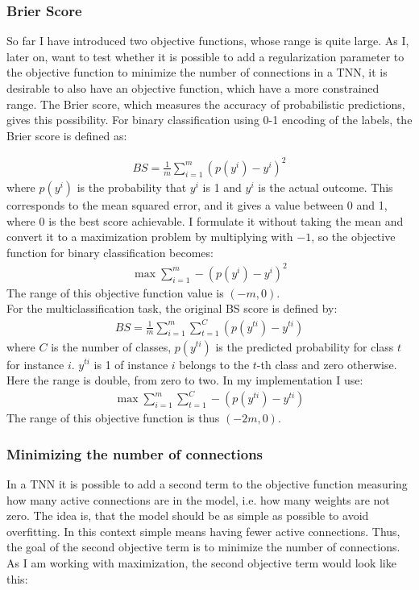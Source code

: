 \subsubsection{Brier Score}
So far I have introduced two objective functions, whose range is quite large. As I, later on, want to test whether it is possible to add a regularization parameter to the objective function to minimize the number of connections in a TNN, it is desirable to also have an objective function, which have a more constrained range. The Brier score, which measures the accuracy of probabilistic predictions, gives this possibility. For binary classification using 0-1 encoding of the labels, the Brier score is defined as: 

\begin{align}
    BS = \frac{1}{m} \sum_{i = 1} ^m (p(y^i) - y^i) ^2 
\end{align}
where $p(y^i)$ is the probability that $y^i$ is 1 and $y^i$ is the actual outcome. This corresponds to the mean squared error, and it gives a value between 0 and 1, where 0 is the best score achievable. I formulate it without taking the mean and convert it to a maximization problem by multiplying with $-1$, so the objective function for binary classification becomes:
\begin{align}
    \label{BS_binary} \max \sum_{i=1}^m - (p(y^i) - y^i) ^2 
\end{align}
The range of this objective function value is $(-m, 0)$. \\
\noindent For the multiclassification task, the original BS score is defined by: 
\begin{align}
    BS = \frac{1} {m} \sum_{i=1} ^m \sum_{t=1} ^C (p(y^{ti}) - y^{ti})
\end{align}
where $C$ is the number of classes, $p(y^{ti})$ is the predicted probability for class $t$ for instance $i$. $y^{ti}$ is 1 of instance $i$ belongs to the $t$-th class and zero otherwise. Here the range is double, from zero to two. In my implementation I use:
\begin{align}
    \label{BS} \max \sum_{i=1}^m \sum_{t=1} ^C - (p(y^{ti}) - y^{ti})
\end{align}
The range of this objective function is thus $(-2m, 0)$. 
\subsubsection{Minimizing the number of connections}
In a TNN it is possible to add a second term to the objective function measuring how many active connections are in the model, i.e. how many weights are not zero. The idea is, that the model should be as simple as possible to avoid overfitting. In this context simple means having fewer active connections. Thus, the goal of the second objective term is to minimize the number of connections. As I am working with maximization, the second objective term would look like this:

